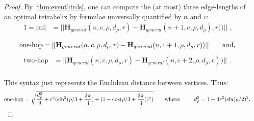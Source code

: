 \documentclass[10pt,final]{journals-1.0/asme2ej}
\renewcommand{\vec}[1]{\mathbf{#1}}
\begin{document}
\begin{proof}
By \cref{thm:eventhirds}, one can compute the (at most) three edge-lengths of an optimal
tetrahelix by formulae universally quantified by $n$ and $c$:
\begin{equation}
  \begin{split}
  1 = \text{rail} &= || \vec{H}_{general}(n,c,\rho,d_{\rho},r)  - 
  \vec{H}_{general}(n+1,c,\rho,d_{\rho}),r)) || \text{ ,} \\
  \end{split}
\end{equation}
\begin{equation}
  \begin{split}  
  \text{one-hop} &= || \vec{H}_{general}(n,c,\rho,d_{\rho},r)  - 
   \vec{H}_{general}(n,c+1,\rho,d_{\rho},r)) || \text{\qquad and,} \\
  \end{split}  
\end{equation}  
  \begin{equation}
  \begin{split}    
  \text{two-hop} &= || \vec{H}_{general}(n,c,\rho,d_{\rho},r)  - 
   \vec{H}_{general}(n,c+2,\rho,d_{\rho},r)) || \text{ .}\\
  \end{split}  
\end{equation}  

This syntax just represents the Euclidean distance between vertices. Thus:
\begin{equation}
  \text{one-hop}  = \sqrt{\frac{d_{\rho}^2}{9} + r^2(\sin^2(\rho/3 + \frac{2\pi}{3})  + (1 - \cos(\rho/3 + \frac{2\pi}{3}))^2)} \text{\qquad where: \qquad}   d_{\rho}^2 = 1 - 4 r^2 (\sin( \rho / 2)^2.
\end{equation}




\end{proof}
\end{document}

